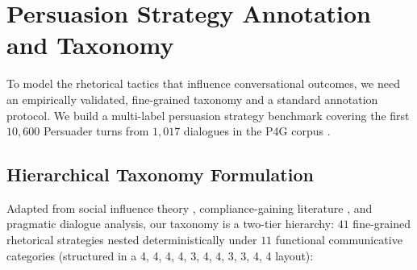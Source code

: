 \section{Persuasion Strategy Annotation and Taxonomy}
\label{sec:strategy-annotation}

To model the rhetorical tactics that influence conversational outcomes, we need an empirically validated, fine-grained taxonomy and a standard annotation protocol. We build a multi-label persuasion strategy benchmark covering the first $10{,}600$ Persuader turns from $1{,}017$ dialogues in the P4G corpus \cite{wang2019persuasion}.

\subsection{Hierarchical Taxonomy Formulation}
Adapted from social influence theory \cite{cialdini2001influence}, compliance-gaining literature \cite{freedman1966compliance,cialdini1975reciprocal}, and pragmatic dialogue analysis, our taxonomy is a two-tier hierarchy: $41$ fine-grained rhetorical strategies nested deterministically under $11$ functional communicative categories (structured in a 4, 4, 4, 4, 3, 4, 4, 3, 3, 4, 4 layout):
